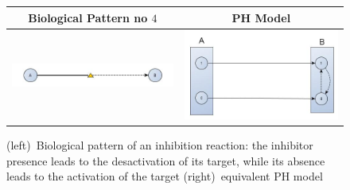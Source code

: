 \documentclass[11pt,a4paper,twoside]{epig}
\begin{document}
\begin{figure}[ht]
\begin{tabular}{|c|c|}
\hline
Biological Pattern no $4$ & PH Model \\
\hline
 \includegraphics[scale=0.3]{./imagesannexe/phdrawings/4cyt.jpg} & \includegraphics[scale=0.14]{./imagesannexe/phdrawings/4ph.jpg} \\
 \hline
\end{tabular}
\caption{\label{fig:pattern:4}
(left)~Biological pattern of an inhibition reaction: the inhibitor presence leads to the desactivation of its target,
while its absence leads to the activation of the target
(right)~equivalent PH model
}
\end{figure}
\end{document}

